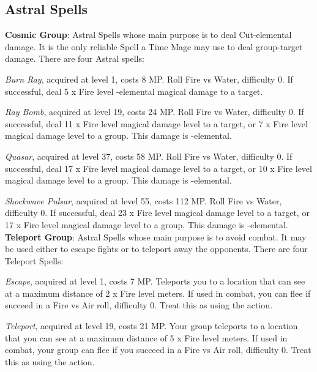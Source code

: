 \begin{multicols}{2}
    
    \subsection{Astral Spells}\label{subsec:time-astral}

    \textbf{Cosmic Group}: Astral Spells whose main purpose is to deal Cut-elemental damage. It is the only reliable Spell a Time Mage may use to deal group-target damage. There are four Astral spells:
    
    \textit{Burn Ray}, acquired at level 1, costs 8 MP\@. Roll Fire vs Water, difficulty 0. If successful, deal 5 x Fire level -elemental magical damage to a target.
    
    \textit{Ray Bomb}, acquired at level 19, costs 24 MP\@. Roll Fire vs Water, difficulty 0. If successful, deal 11 x Fire level magical damage level to a target, or 7 x Fire level magical damage level to a group. This damage is -elemental.
    
    \textit{Quasar}, acquired at level 37, costs 58 MP\@. Roll Fire vs Water, difficulty 0. If successful, deal 17 x Fire level magical damage level to a target, or 10 x Fire level magical damage level to a group. This damage is -elemental.
    
    \textit{Shockwave Pulsar}, acquired at level 55, costs 112 MP\@. Roll Fire vs Water, difficulty 0. If successful, deal 23 x Fire level magical damage level to a target, or 17 x Fire level magical damage level to a group. This damage is -elemental.\\%
    
    \textbf{Teleport Group}: Astral Spells whose main purpose is to avoid combat. It may be used either to escape fights or to teleport away the opponents. There are four Teleport Spells:
	
    \textit{Escape}, acquired at level 1, costs 7 MP\@. Teleports you to a location that can see at a maximum distance of 2 x Fire level meters. If used in combat, you can flee if succeed in a Fire vs Air roll, difficulty 0. Treat this as using the  action.
    
    \textit{Teleport}, acquired at level 19, costs 21 MP\@. Your group teleports to a location that you can see at a maximum distance of 5 x Fire level meters. If used in combat, your group can flee if you succeed in a Fire vs Air roll, difficulty 0. Treat this as using the  action.
    

\end{multicols}
